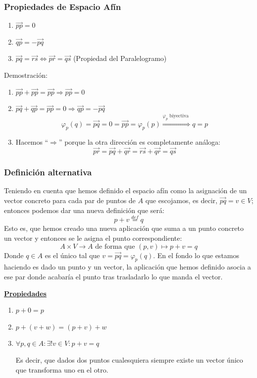 \documentclass[10pt,a4paper,openright]{book}
\theoremstyle{break}
\begin{document}
\subsubsection*{Propiedades de Espacio Afín}
\begin{enumerate}
\item $\vec{pp} = 0$

\item $\vec{qp} = - \vec{pq}$

\item $\vec{pq} = \vec{rs} \Leftrightarrow \vec{pr} = \vec{qs}$ (Propiedad del Paralelogramo)
\end{enumerate}

Demostración:
\begin{enumerate}
\item $\vec{pp} + \vec{pp} = \vec{pp} \Rightarrow \vec{pp} = 0$

\item $\vec{pq} + \vec{qp} = \vec{pp} = 0 \Rightarrow \vec{qp}=-\vec{pq}$
$$\varphi_p(q) = \vec{pq} = 0 = \vec{pp} = \varphi_p (p) \overset{\varphi_p \mbox{ biyectiva }}{\Rightarrow} q = p$$

\item Hacemos ``$\Rightarrow$'' porque la otra dirección es completamente análoga:
$$\vec{pr} = \vec{pq} + \vec{qr} = \vec{rs} + \vec{qr} = \vec{qs}$$
\end{enumerate}

\subsubsection*{Definición alternativa}
Teniendo en cuenta que hemos definido el espacio afín como la asignación de un vector concreto para cada par de puntos de $A$ que escojamos, es decir, $\vec{pq} = v \in V$; entonces podemos dar una nueva definición que será:
$$p + v \overset{def}{=} q$$
Esto es, que hemos creado una nueva aplicación que suma a un punto concreto un vector y entonces se le asigna el punto correspondiente:
$$A \times V \to A\mbox{ de forma que } (p,v) \mapsto p + v = q$$
Donde $q \in A$ es el único tal que $v = \vec{pq} = \varphi_p(q)$. En el fondo lo que estamos haciendo es dado un punto y un vector, la aplicación que hemos definido asocia a ese par donde acabaría el punto tras trasladarlo lo que manda el vector.

\underline{\textbf{Propiedades}}
\begin{enumerate}
\item $p + 0 = p$

\item $p + (v+ w) = (p + v)+ w$

\item $\forall p,q \in A: \exists! v \in V : p + v = q$

Es decir, que dados dos puntos cualesquiera siempre existe un vector único que transforma uno en el otro.
\end{enumerate}
\end{document}
